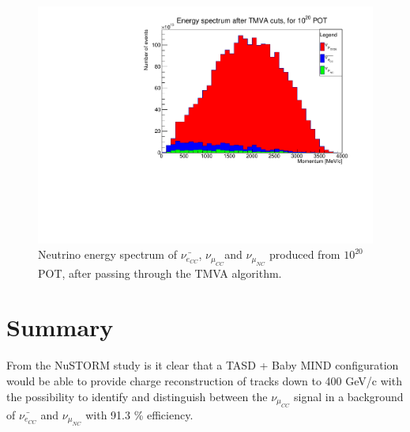 \begin{figure}[h!]
\centering
\includegraphics[width=.9\textwidth]{figures/NeutrinoChap/SpectrumAfterTMVA.pdf}
\caption{Neutrino energy spectrum of $\bar{\nu_{e_{CC}}}$, $\nu_{\mu_{CC}}$and $\nu_{\mu_{NC}}$ produced from $10^{20}$ POT, after passing through the TMVA algorithm.}
\label{fig:TMVAEspectrumAfter}
\end{figure}





\pagebreak
\newpage

\section{Summary}
From the NuSTORM study is it clear that a TASD + Baby MIND configuration would be able to provide charge reconstruction of tracks down to 400 GeV/c with the possibility to identify and distinguish between the $\nu_{\mu_{CC}}$ signal in a background of $\bar{\nu_{e_{CC}}}$ and $\nu_{\mu_{NC}}$ with 91.3 \% efficiency.


\pagebreak
\newpage
